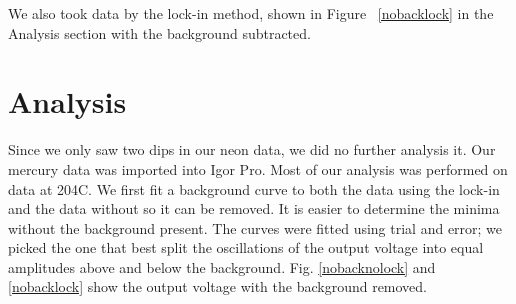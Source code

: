 \documentclass[prb,preprint]{revtex4-1}
\begin{document}
We also took data by the lock-in method, shown in Figure ~\ref{nobacklock} in the Analysis section with the background subtracted. 















































































































\section{Analysis}
Since we only saw two dips in our neon data, we did no further analysis it. Our mercury data was imported into Igor Pro. Most of our analysis was performed on data at 204\degree C. 
We first fit a background curve to both the data using the lock-in and the data without so it can be removed.
It is easier to determine the minima without the background present.
The curves were fitted using trial and error; we picked the one that best split the oscillations of the output voltage into equal amplitudes above and below the background. 
Fig. \ref{nobacknolock} and \ref{nobacklock} show the output voltage with the background removed. 
\end{document}
